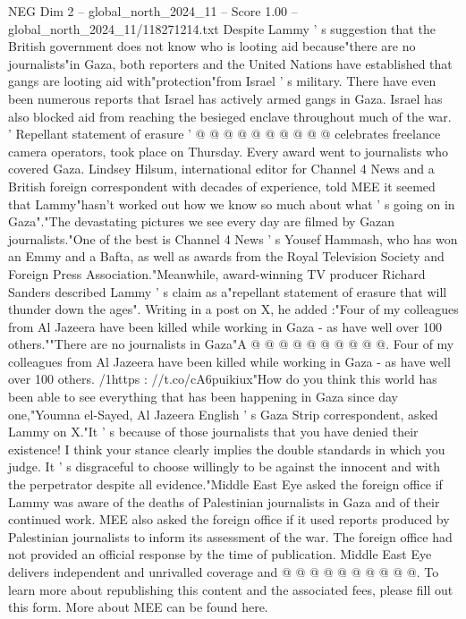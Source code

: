 \begin{textsample}{NEG Dim 2 – global\_north\_2024\_11 – Score 1.00 – global\_north\_2024\_11/118271214.txt}
Despite Lammy ' s suggestion that the British government does not know who is looting aid because"there are no journalists"in Gaza, both reporters and the United Nations have established that gangs are looting aid with"protection"from Israel ' s military.
There have even been numerous reports that Israel has actively armed gangs in Gaza.
Israel has also blocked aid from reaching the besieged enclave throughout much of the war. ' Repellant statement of erasure ' @ @ @ @ @ @ @ @ @ @ celebrates freelance camera operators, took place on Thursday.
Every award went to journalists who covered Gaza.
Lindsey Hilsum, international editor for Channel 4 News and a British foreign correspondent with decades of experience, told MEE it seemed that Lammy"hasn't worked out how we know so much about what ' s going on in Gaza"."The devastating pictures we see every day are filmed by Gazan journalists."One of the best is Channel 4 News ' s Yousef Hammash, who has won an Emmy and a Bafta, as well as awards from the Royal Television Society and Foreign Press Association."Meanwhile, award-winning TV producer Richard Sanders described Lammy ' s claim as a"repellant statement of erasure that will thunder down the ages".
Writing in a post on X, he added :"Four of my colleagues from Al Jazeera have been killed while working in Gaza - as have well over 100 others.""There are no journalists in Gaza"A @ @ @ @ @ @ @ @ @ @.
Four of my colleagues from Al Jazeera have been killed while working in Gaza - as have well over 100 others. /1https : //t.co/cA6puikiux"How do you think this world has been able to see everything that has been happening in Gaza since day one,"Youmna el-Sayed, Al Jazeera English ' s Gaza Strip correspondent, asked Lammy on X."It ' s because of those journalists that you have denied their existence!
I think your stance clearly implies the double standards in which you judge.
It ' s disgraceful to choose willingly to be against the innocent and with the perpetrator despite all evidence."Middle East Eye asked the foreign office if Lammy was aware of the deaths of Palestinian journalists in Gaza and of their continued work.
MEE also asked the foreign office if it used reports produced by Palestinian journalists to inform its assessment of the war.
The foreign office had not provided an official response by the time of publication.
Middle East Eye delivers independent and unrivalled coverage and @ @ @ @ @ @ @ @ @ @.
To learn more about republishing this content and the associated fees, please fill out this form.
More about MEE can be found here.

\end{textsample}

